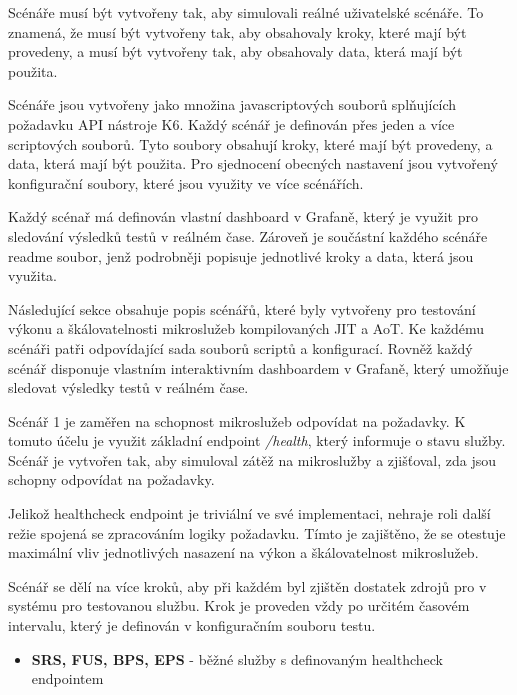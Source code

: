 
Scénáře musí být vytvořeny tak, aby simulovali reálné uživatelské scénáře. To znamená, že musí být vytvořeny tak, aby obsahovaly kroky, které mají být provedeny, a musí být vytvořeny tak, aby obsahovaly data, která mají být použita.


Scénáře jsou vytvořeny jako množina javascriptových souborů splňujících požadavku API nástroje K6. Každý scénář je definován přes jeden a více scriptových souborů. Tyto soubory obsahují kroky, které mají být provedeny, a data, která mají být použita. Pro sjednocení obecných nastavení jsou vytvořený konfigurační soubory, které jsou využity ve více scénářích.

Každý scénař má definován vlastní dashboard v Grafaně, který je využit pro sledování výsledků testů v reálném čase. Zároveň je součástní každého scénáře readme soubor, jenž podrobněji popisuje jednotlivé kroky a data, která jsou využita.


Následující sekce obsahuje popis scénářů, které byly vytvořeny pro testování výkonu a škálovatelnosti mikroslužeb kompilovaných JIT a AoT. Ke každému scénáři patři odpovídající sada souborů scriptů a konfigurací. Rovněž každý scénář disponuje vlastním interaktivním dashboardem v Grafaně, který umožňuje sledovat výsledky testů v reálném čase.


Scénář 1 je zaměřen na schopnost mikroslužeb odpovídat na požadavky. K tomuto účelu je využit základní endpoint \emph{/health}, který informuje o stavu služby. Scénář je vytvořen tak, aby simuloval zátěž na mikroslužby a zjišťoval, zda jsou schopny odpovídat na požadavky.

Jelikož healthcheck endpoint je triviální ve své implementaci, nehraje roli další režie spojená se zpracováním logiky požadavku. Tímto je zajištěno, že se otestuje maximální vliv jednotlivých nasazení na výkon a škálovatelnost mikroslužeb.

Scénář se dělí na více kroků, aby při každém byl zjištěn dostatek zdrojů pro v systému pro testovanou službu. Krok je proveden vždy po určitém časovém intervalu, který je definován v konfiguračním souboru testu.


\begin{itemize}
    \item \textbf{SRS, FUS, BPS, EPS} - běžné služby s definovaným healthcheck endpointem
\end{itemize}

